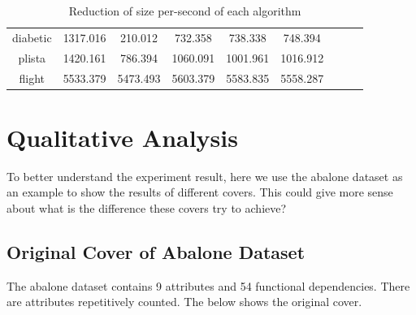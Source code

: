 \documentclass[11pt]{book}
\begin{document}
\begin{table}
\begin{tabular}{|c|c|c|c|c|c|c|c|c|}
diabetic & 1317.016 & 210.012 & 732.358 & 738.338 & 748.394 && \\                                                                                                                                                       
plista & 1420.161 & 786.394 & 1060.091 & 1001.961 & 1016.912 && \\                                                                                                                                                      
flight & 5533.379 & 5473.493 & 5603.379 & 5583.835 & 5558.287 && \\	

    \hline
        
\end{tabular}

	\caption{Reduction of size per-second of each algorithm}

\end{table}

\section{Qualitative Analysis}

To better understand the experiment result, here we use the abalone dataset as an example to show the results of different covers. This could give more sense about what is the difference these covers try to achieve?

\subsection{Original Cover of Abalone Dataset}

The abalone dataset contains 9 attributes and 54 functional dependencies. There are attributes repetitively counted. The below shows the original cover.
\end{document}
